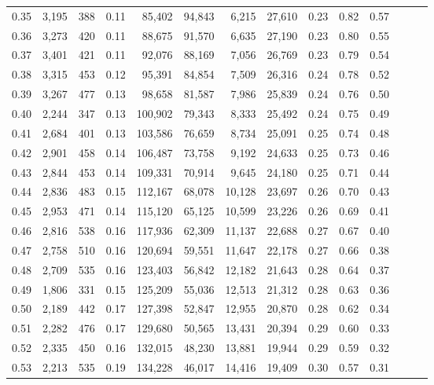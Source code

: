 \begin{tabular}{rrrrrrrrrrrrrr}
0.35 &  3,195 &  388 &  0.11 &   85,402 &   94,843 &   6,215 &  27,610 &  0.23 &  0.82 &      0.57 \\
0.36 &  3,273 &  420 &  0.11 &   88,675 &   91,570 &   6,635 &  27,190 &  0.23 &  0.80 &      0.55 \\
0.37 &  3,401 &  421 &  0.11 &   92,076 &   88,169 &   7,056 &  26,769 &  0.23 &  0.79 &      0.54 \\
0.38 &  3,315 &  453 &  0.12 &   95,391 &   84,854 &   7,509 &  26,316 &  0.24 &  0.78 &      0.52 \\
0.39 &  3,267 &  477 &  0.13 &   98,658 &   81,587 &   7,986 &  25,839 &  0.24 &  0.76 &      0.50 \\
0.40 &  2,244 &  347 &  0.13 &  100,902 &   79,343 &   8,333 &  25,492 &  0.24 &  0.75 &      0.49 \\
0.41 &  2,684 &  401 &  0.13 &  103,586 &   76,659 &   8,734 &  25,091 &  0.25 &  0.74 &      0.48 \\
0.42 &  2,901 &  458 &  0.14 &  106,487 &   73,758 &   9,192 &  24,633 &  0.25 &  0.73 &      0.46 \\
0.43 &  2,844 &  453 &  0.14 &  109,331 &   70,914 &   9,645 &  24,180 &  0.25 &  0.71 &      0.44 \\
0.44 &  2,836 &  483 &  0.15 &  112,167 &   68,078 &  10,128 &  23,697 &  0.26 &  0.70 &      0.43 \\
0.45 &  2,953 &  471 &  0.14 &  115,120 &   65,125 &  10,599 &  23,226 &  0.26 &  0.69 &      0.41 \\
0.46 &  2,816 &  538 &  0.16 &  117,936 &   62,309 &  11,137 &  22,688 &  0.27 &  0.67 &      0.40 \\
0.47 &  2,758 &  510 &  0.16 &  120,694 &   59,551 &  11,647 &  22,178 &  0.27 &  0.66 &      0.38 \\
0.48 &  2,709 &  535 &  0.16 &  123,403 &   56,842 &  12,182 &  21,643 &  0.28 &  0.64 &      0.37 \\
0.49 &  1,806 &  331 &  0.15 &  125,209 &   55,036 &  12,513 &  21,312 &  0.28 &  0.63 &      0.36 \\
0.50 &  2,189 &  442 &  0.17 &  127,398 &   52,847 &  12,955 &  20,870 &  0.28 &  0.62 &      0.34 \\
0.51 &  2,282 &  476 &  0.17 &  129,680 &   50,565 &  13,431 &  20,394 &  0.29 &  0.60 &      0.33 \\
0.52 &  2,335 &  450 &  0.16 &  132,015 &   48,230 &  13,881 &  19,944 &  0.29 &  0.59 &      0.32 \\
0.53 &  2,213 &  535 &  0.19 &  134,228 &   46,017 &  14,416 &  19,409 &  0.30 &  0.57 &      0.31 \\

\end{tabular}

